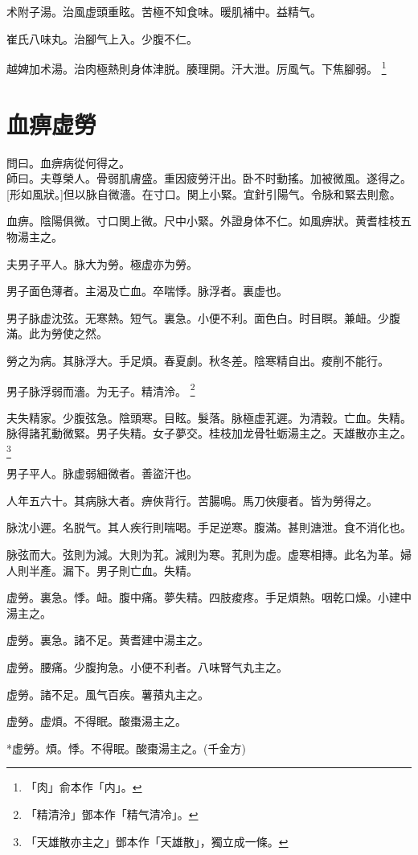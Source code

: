 \documentclass[12pt,oneside,UTF8,b5paper]{ctexbook}她她她她她她她
\begin{document}
术附子湯。治風虚頭重眩。苦極不知食味。暖肌補中。益精气。

崔氏八味丸。治腳气上入。少腹不仁。

越婢加术湯。治肉極熱則身体津脱。腠理開。汗大泄。厉風气。下焦腳弱。
	\footnote{「肉」俞本作「内」。}

\chapter{血痹虚勞}

問曰。血痹病從何得之。\\
師曰。夫尊榮人。骨弱肌膚盛。重因疲勞汗出。卧不时動搖。加被微風。遂得之。[形如風狀。]但以脉自微濇。在寸口。関上小緊。宜針引陽气。令脉和緊去則愈。

血痹。陰陽俱微。寸口関上微。尺中小緊。外證身体不仁。如風痹狀。黄耆桂枝五物湯主之。

夫男子平人。脉大为勞。極虚亦为勞。

男子面色薄者。主渴及亡血。卒喘悸。脉浮者。裏虚也。

男子脉虚沈弦。无寒熱。短气。裏急。小便不利。面色白。时目瞑。兼衄。少腹滿。此为勞使之然。

勞之为病。其脉浮大。手足煩。春夏劇。秋冬差。陰寒精自出。痠削不能行。

男子脉浮弱而濇。为无子。精清泠。
	\footnote{「精清泠」鄧本作「精气清冷」。}

夫失精家。少腹弦急。陰頭寒。目眩。髮落。脉極虚芤遲。为清穀。亡血。失精。脉得諸芤動微緊。男子失精。女子夢交。桂枝加龙骨牡蛎湯主之。天雄散亦主之。
	\footnote{「天雄散亦主之」鄧本作「天雄散」，獨立成一條。}

男子平人。脉虚弱細微者。善盜汗也。

人年五六十。其病脉大者。痹俠背行。苦腸鳴。馬刀俠癭者。皆为勞得之。

脉沈小遲。名脱气。其人疾行則喘喝。手足逆寒。腹滿。甚則溏泄。食不消化也。

脉弦而大。弦則为減。大則为芤。減則为寒。芤則为虚。虚寒相摶。此名为革。婦人則半產。漏下。男子則亡血。失精。

虚勞。裏急。悸。衄。腹中痛。夢失精。四肢痠疼。手足煩熱。咽乾口燥。小建中湯主之。

虚勞。裏急。諸不足。黄耆建中湯主之。

虚勞。腰痛。少腹拘急。小便不利者。八味腎气丸主之。

虚勞。諸不足。風气百疾。薯蕷丸主之。

虚勞。虚煩。不得眠。酸棗湯主之。

*虚勞。煩。悸。不得眠。酸棗湯主之。(千金方)
\end{document}
